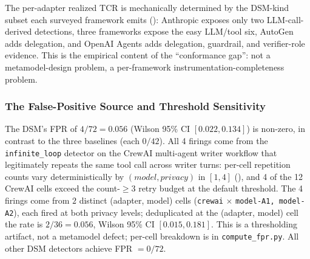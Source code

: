 \documentclass[a4paper,UKenglish,cleveref,autoref,thm-restate]{lipics-v2021}
\begin{document}
The per-adapter realized TCR is mechanically determined by the
DSM-kind subset each surveyed framework emits ():
Anthropic exposes only two LLM-call-derived detections, three
frameworks expose the easy LLM/tool six, AutoGen adds delegation, and
OpenAI Agents adds delegation, guardrail, and verifier-role evidence.
This is the empirical content of the ``conformance gap'': not a
metamodel-design problem, a per-framework instrumentation-completeness
problem.

\subsubsection*{The False-Positive Source and Threshold Sensitivity}

The DSM's FPR of $4/72 = 0.056$ (Wilson 95\% CI $[0.022, 0.134]$)
is non-zero, in contrast to the three baselines (each $0/42$). All
4 firings come from the \texttt{infinite\_loop} detector on the
CrewAI multi-agent writer workflow that legitimately repeats the
same tool call across writer turns: per-cell repetition counts vary
deterministically by $(model, privacy)$ in $[1, 4]$
(), and 4 of the 12 CrewAI cells
exceed the count-$\geq 3$ retry budget at the default threshold.
The 4 firings come from $2$ distinct (adapter, model) cells
(\texttt{crewai} $\times$ \texttt{model-A1, model-A2}), each fired
at both privacy levels; deduplicated at the (adapter, model) cell
the rate is $2/36 = 0.056$, Wilson 95\% CI $[0.015, 0.181]$. This
is a thresholding artifact, not a metamodel defect; per-cell
breakdown is in \texttt{compute\_fpr.py}. All other DSM detectors
achieve FPR $= 0/72$.
\end{document}
